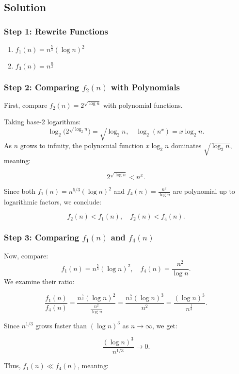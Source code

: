 \documentclass[12pt]{article}
\begin{document}
\subsection*{Solution}

\subsubsection*{Step 1: Rewrite Functions}

\begin{enumerate}
    \item \( f_1(n) = n^{\frac{5}{3}} (\log n)^2 \)
    \item \( f_3(n) = n^{\frac{n}{2}} \)
\end{enumerate}

\subsubsection*{Step 2: Comparing \( f_2(n) \) with Polynomials}
First, compare \( f_2(n) = 2^{\sqrt{\log n}} \) with polynomial functions.

Taking base-2 logarithms:
\[
\log_2\big( 2^{\sqrt{\log_2 n}} \big) = \sqrt{\log_2 n}, \quad
\log_2(n^x) = x \log_2 n.
\]
As \( n \) grows to infinity, the polynomial function \( x \log_2 n \) dominates \( \sqrt{\log_2 n} \), meaning:

\[
2^{\sqrt{\log n}} < n^x.
\]

Since both \( f_1(n) = n^{5/3} (\log n)^2 \) and \( f_4(n) = \frac{n^2}{\log n} \) are polynomial up to logarithmic factors, we conclude:

\[
f_2(n) < f_1(n), \quad f_2(n) < f_4(n).
\]

\subsubsection*{Step 3: Comparing \( f_1(n) \) and \( f_4(n) \)}
Now, compare:
\[
f_1(n) = n^{\frac{5}{3}} (\log n)^2, \quad f_4(n) = \frac{n^2}{\log n}.
\]
We examine their ratio:

\[
\frac{f_1(n)}{f_4(n)}
= \frac{n^{\frac{5}{3}} (\log n)^2}{\frac{n^2}{\log n}}
= \frac{n^{\frac{5}{3}} (\log n)^3}{n^2}
= \frac{(\log n)^3}{n^{\frac{1}{3}}}.
\]

Since \( n^{1/3} \) grows faster than \( (\log n)^3 \) as \( n \to \infty \), we get:

\[
\frac{(\log n)^3}{n^{1/3}} \to 0.
\]

Thus, \( f_1(n) \ll f_4(n) \), meaning:
\end{document}
